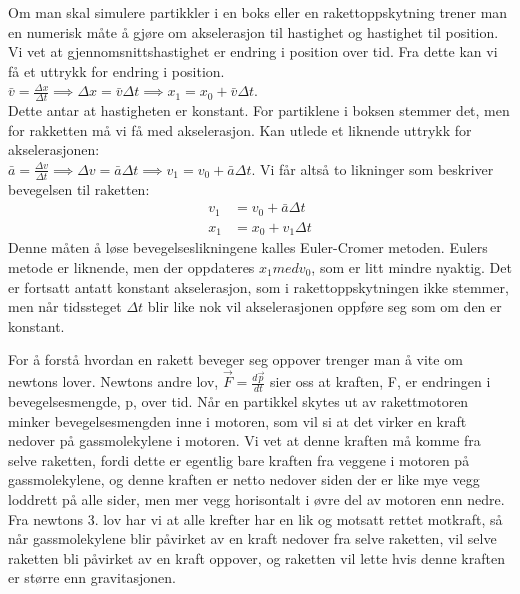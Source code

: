 \documentclass[reprint,english,notitlepage]{revtex4-1}
\begin{document}
	\vspace{0.5cm}

	Om man skal simulere partikkler i en boks eller en rakettoppskytning trener man
	en numerisk måte å gjøre om akselerasjon til hastighet og hastighet til position.
	Vi vet at gjennomsnittshastighet er endring i position over tid. Fra dette kan
	vi få et uttrykk for endring i position. \\
	$\bar{v} = \frac{\Delta x}{\Delta t} \implies \Delta x = \bar{v}\Delta t \implies x_1 = x_0 + \bar{v}\Delta t$. \\
	Dette antar at hastigheten er konstant. For partiklene i boksen stemmer det,
	men for rakketten må vi få med akselerasjon. Kan utlede et liknende uttrykk for akselerasjonen: \\
	$\bar{a} = \frac{\Delta v}{\Delta t} \implies \Delta v = \bar{a}\Delta t \implies v_1 = v_0 + \bar{a}\Delta t$.
	Vi får altså to likninger som beskriver bevegelsen til raketten:
	\begin{align*}
		v_1 &= v_0 + \bar{a}\Delta t \\
		x_1 &= x_0 + v_1\Delta t
	\end{align*}
	Denne måten å løse bevegelseslikningene kalles Euler-Cromer metoden.
	Eulers metode er liknende, men der oppdateres $x_1 med v_0$, som er litt mindre
	nyaktig. Det er fortsatt antatt konstant akselerasjon, som i rakettoppskytningen
	ikke stemmer, men når tidssteget $\Delta t$ blir like nok vil akselerasjonen
	oppføre seg som om den er konstant.

	\vspace{0.5cm}

	For å forstå hvordan en rakett beveger seg oppover trenger man å vite om newtons lover.
	Newtons andre lov, $\vec{F} = \frac{d\vec{p}}{dt}$ sier oss at kraften, F, er endringen
	i bevegelsesmengde, p, over tid. Når en partikkel skytes ut av rakettmotoren minker
	bevegelsesmengden inne i motoren, som vil si at det virker en kraft nedover på gassmolekylene
	i motoren. Vi vet at denne kraften må komme fra selve raketten, fordi dette er egentlig bare
	kraften fra veggene i motoren på gassmolekylene, og denne kraften er netto nedover
	siden der er like mye vegg loddrett på alle sider, men mer vegg horisontalt i øvre del av
	motoren enn nedre. Fra newtons 3. lov har vi at alle krefter har en lik og motsatt
	rettet motkraft, så når gassmolekylene blir påvirket av en kraft nedover fra selve raketten,
	vil selve raketten bli påvirket av en kraft oppover, og raketten vil lette hvis denne
	kraften er større enn gravitasjonen.
\end{document}
